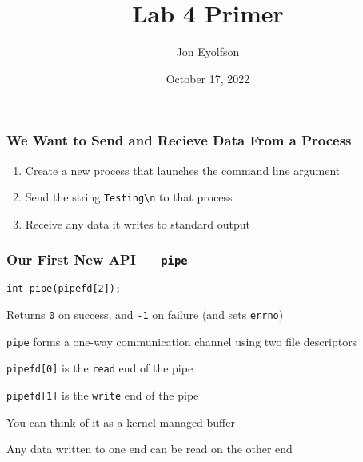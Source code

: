 

\title{Lab 4 Primer}
\author{Jon Eyolfson}
\date{October 17, 2022}


  \begin{frame}
    \titlepage
  \end{frame}

  \begin{frame}
    \frametitle{We Want to Send and Recieve Data From a Process}

    \begin{enumerate}
      \item Create a new process that launches the command line argument
      \item Send the string \texttt{Testing\textbackslash n} to that process
      \item Receive any data it writes to standard output
    \end{enumerate}
  \end{frame}

  \begin{frame}
    \frametitle{Our First New API --- \texttt{pipe}}

    \lstinline!int pipe(pipefd[2]);!

    \vspace{2em}

    Returns \texttt{0} on success, and \texttt{-1} on failure
    (and sets \texttt{errno})

    \vspace{2em}

    \texttt{pipe} forms a one-way communication channel using two file
    descriptors

    \hspace{2em} \texttt{pipefd[0]} is the \texttt{read} end of the pipe

    \hspace{2em} \texttt{pipefd[1]} is the \texttt{write} end of the pipe

    \vspace{2em}

    You can think of it as a kernel managed buffer
    
    \hspace{2em} Any data written to one end can be read on the other end
  \end{frame}


